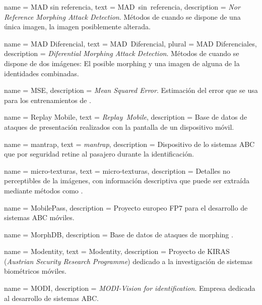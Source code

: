 {
    name        = {MAD sin referencia},
    text        = {\mbox{MAD sin referencia}},
    description = {\textit{Nor Reference Morphing Attack Detection}. Métodos de  cuando se dispone de una única imagen, la imagen posiblemente alterada.}
}

{
    name        = {MAD Diferencial},
    text        = {\mbox{MAD Diferencial}},
    plural      = {MAD Diferenciales},
    description = {\textit{Diferential Morphing Attack Detection}. Métodos de  cuando se dispone de dos imágenes: El posible \gls{morphing} y una imagen de alguna de la identidades combinadas.}
}

{
    name        = {MSE},
    description = {\textit{Mean Squared Error}. Estimación del error que se usa para los entrenamientos de .}
}

{
    name        = {Replay Mobile},
    text        = {\mbox{\textit{Replay Mobile}}},
    description = {Base de datos de ataques de presentación realizados con la pantalla de un dispositivo móvil.}
}

{
    name        = {mantrap},
    text        = {\textit{mantrap}},
    description = {Dispositivo de lo sistemas ABC que por seguridad retine al pasajero durante la identificación.}
}

{
    name        = {micro-texturas},
    text        = {\mbox{micro-texturas}},
    description = {Detalles no perceptibles de la imágenes, con información descriptiva que puede ser extraída mediante métodos como  \cite{ojala2000gray}.}
}

{
    name        = {MobilePass},
    description = {Proyecto europeo FP$7$ para el desarrollo de sistemas ABC móviles.}
}

{
    name        = {MorphDB},
    description = {Base de datos de ataques de \gls{morphing} \cite{ferrara2017face}.}
}

{
    name        = {Modentity},
    text        = {\mbox{Modentity}},
    description = {Proyecto de KIRAS (\textit{Austrian Security Research Programme}) dedicado a la investigación de sistemas biométricos móviles.}
}

{
    name        = {MODI},
    description = {\textit{MODI-Vision for identification}. Empresa dedicada al desarrollo de sistemas ABC.}
}

